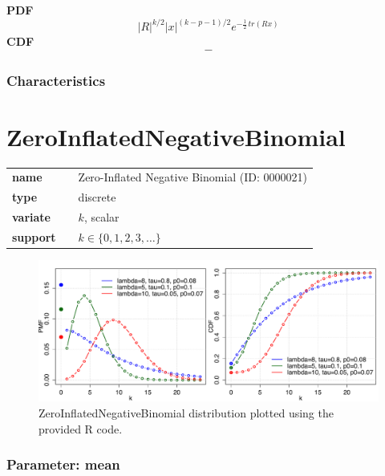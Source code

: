 \smallskip \noindent \hspace{.2cm} \textbf{PDF} 
\begin{equation*}|R|^{k/2}|x|^{(k-p-1)/2}e^{-\frac{1}2\,tr(Rx)}\end{equation*}
\smallskip \noindent \hspace{.2cm} \textbf{CDF} 
\begin{equation*}-\end{equation*}
\smallskip
\subsubsection*{Characteristics}
\smallskip
\section*{ZeroInflatedNegativeBinomial} 

  \bigskip 

\begin{tabular}{p{2cm}cl}
\textbf{name} & & Zero-Inflated Negative Binomial (ID: 0000021)\\ 
 
\textbf{type} & & discrete \\ 

\textbf{variate} & & $k$, scalar \\ 

\textbf{support} & & $k \in \{0,1,2,3,\dots\}$
\end{tabular}

\begin{figure}[ht!]
\centering
  \includegraphics[width=140mm]{pics/ZeroInflatedNegativeBinomial.pdf}
 \caption{ZeroInflatedNegativeBinomial distribution plotted using the provided R code.}
 \label{fig:ZeroInflatedNegativeBinomial}
\end{figure}

\subsubsection*{Parameter: mean}

